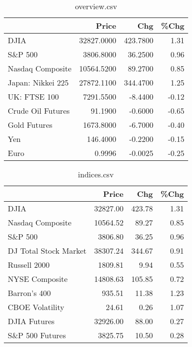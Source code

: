 \documentclass{article}%
\begin{document}
\begin{table}[htbp]%
\caption{overview.csv}%
\centering%
\begin{adjustbox}{width=1\textwidth}%
\begin{tabular}{lrrr}
\toprule
                  &      Price &      Chg &  \%Chg \\
\midrule
             DJIA & 32827.0000 & 423.7800 &  1.31 \\
          S\&P 500 &  3806.8000 &  36.2500 &  0.96 \\
 Nasdaq Composite & 10564.5200 &  89.2700 &  0.85 \\
Japan: Nikkei 225 & 27872.1100 & 344.4700 &  1.25 \\
     UK: FTSE 100 &  7291.5500 &  -8.4400 & -0.12 \\
Crude Oil Futures &    91.1900 &  -0.6000 & -0.65 \\
     Gold Futures &  1673.8000 &  -6.7000 & -0.40 \\
              Yen &   146.4000 &  -0.2200 & -0.15 \\
             Euro &     0.9996 &  -0.0025 & -0.25 \\
\bottomrule
\end{tabular}
%
\end{adjustbox}%
\end{table}

%


\begin{table}[htbp]%
\caption{indices.csv}%
\centering%
\begin{adjustbox}{width=1\textwidth}%
\begin{tabular}{lrrr}
\toprule
                      &    Price &    Chg &  \%Chg \\
\midrule
                 DJIA & 32827.00 & 423.78 &  1.31 \\
     Nasdaq Composite & 10564.52 &  89.27 &  0.85 \\
              S\&P 500 &  3806.80 &  36.25 &  0.96 \\
DJ Total Stock Market & 38307.24 & 344.67 &  0.91 \\
         Russell 2000 &  1809.81 &   9.94 &  0.55 \\
       NYSE Composite & 14808.63 & 105.85 &  0.72 \\
         Barron's 400 &   935.51 &  11.38 &  1.23 \\
      CBOE Volatility &    24.61 &   0.26 &  1.07 \\
         DJIA Futures & 32926.00 &  88.00 &  0.27 \\
      S\&P 500 Futures &  3825.75 &  10.50 &  0.28 \\
\bottomrule
\end{tabular}
%
\end{adjustbox}%
\end{table}
\end{document}
